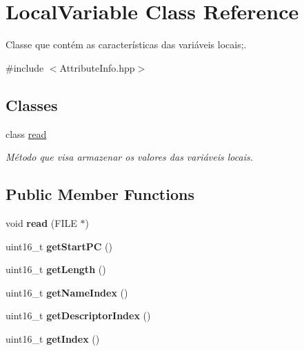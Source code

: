 \hypertarget{classLocalVariable}{}\section{Local\+Variable Class Reference}
\label{classLocalVariable}


Classe que contém as características das variáveis locais;.  




{\ttfamily \#include $<$Attribute\+Info.\+hpp$>$}

\subsection*{Classes}
\begin{DoxyCompactItemize}
\item 
class \hyperlink{classLocalVariable_1_1read}{read}
\begin{DoxyCompactList}\small\item\em Método que visa armazenar os valores das variáveis locais. \end{DoxyCompactList}\end{DoxyCompactItemize}
\subsection*{Public Member Functions}
\begin{DoxyCompactItemize}
\item 
void {\bfseries read} (F\+I\+LE $\ast$)\hypertarget{classLocalVariable_a3cef8432f0a18abb1f809112b14bda18}{}\label{classLocalVariable_a3cef8432f0a18abb1f809112b14bda18}

\item 
uint16\+\_\+t {\bfseries get\+Start\+PC} ()\hypertarget{classLocalVariable_a3ed983dbf92a7b56a4096eb928ab6969}{}\label{classLocalVariable_a3ed983dbf92a7b56a4096eb928ab6969}

\item 
uint16\+\_\+t {\bfseries get\+Length} ()\hypertarget{classLocalVariable_a9523495de1a150cd40807915f26350f7}{}\label{classLocalVariable_a9523495de1a150cd40807915f26350f7}

\item 
uint16\+\_\+t {\bfseries get\+Name\+Index} ()\hypertarget{classLocalVariable_a4e18764c127c71b468d8293d82eb8829}{}\label{classLocalVariable_a4e18764c127c71b468d8293d82eb8829}

\item 
uint16\+\_\+t {\bfseries get\+Descriptor\+Index} ()\hypertarget{classLocalVariable_a93edc1eea8e9e8707bc6695468e60f41}{}\label{classLocalVariable_a93edc1eea8e9e8707bc6695468e60f41}

\item 
uint16\+\_\+t {\bfseries get\+Index} ()\hypertarget{classLocalVariable_a7ca64976e76d4ac0e42436f713cc48f6}{}\label{classLocalVariable_a7ca64976e76d4ac0e42436f713cc48f6}

\end{DoxyCompactItemize}


